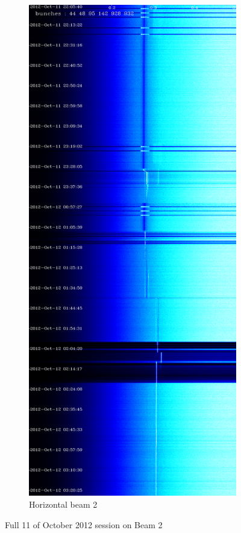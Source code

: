 \begin{figure}[H]
\begin{subfigure}{.5\textwidth}
\end{subfigure}%
\begin{subfigure}{.5\textwidth}
  \centering
  \includegraphics[width=.8\linewidth]{md-121011-hb2-bunches111111-16.png}
  \caption{Horizontal beam 2}
\end{subfigure}
\caption{Full 11 of October 2012 session on Beam 2}
\end{figure}


